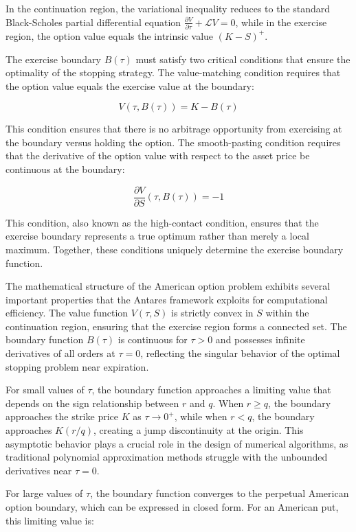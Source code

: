 \documentclass[
  american,
  11pt,
  11pt,
  letterpaper,
  onecolumn]{article}
\begin{document}
In the continuation region, the variational inequality reduces to the
standard Black-Scholes partial differential equation
\(\frac{\partial V}{\partial \tau} + \mathcal{L}V = 0\), while in the
exercise region, the option value equals the intrinsic value
\((K-S)^+\).

The exercise boundary \(B(\tau)\) must satisfy two critical conditions
that ensure the optimality of the stopping strategy. The value-matching
condition requires that the option value equals the exercise value at
the boundary:

\[V(\tau, B(\tau)) = K - B(\tau)\]

This condition ensures that there is no arbitrage opportunity from
exercising at the boundary versus holding the option. The smooth-pasting
condition requires that the derivative of the option value with respect
to the asset price be continuous at the boundary:

\[\frac{\partial V}{\partial S}(\tau, B(\tau)) = -1\]

This condition, also known as the high-contact condition, ensures that
the exercise boundary represents a true optimum rather than merely a
local maximum. Together, these conditions uniquely determine the
exercise boundary function.

The mathematical structure of the American option problem exhibits
several important properties that the Antares framework exploits for
computational efficiency. The value function \(V(\tau, S)\) is strictly
convex in \(S\) within the continuation region, ensuring that the
exercise region forms a connected set. The boundary function \(B(\tau)\)
is continuous for \(\tau > 0\) and possesses infinite derivatives of all
orders at \(\tau = 0\), reflecting the singular behavior of the optimal
stopping problem near expiration.

For small values of \(\tau\), the boundary function approaches a
limiting value that depends on the sign relationship between \(r\) and
\(q\). When \(r \geq q\), the boundary approaches the strike price \(K\)
as \(\tau \to 0^+\), while when \(r < q\), the boundary approaches
\(K(r/q)\), creating a jump discontinuity at the origin. This asymptotic
behavior plays a crucial role in the design of numerical algorithms, as
traditional polynomial approximation methods struggle with the unbounded
derivatives near \(\tau = 0\).

For large values of \(\tau\), the boundary function converges to the
perpetual American option boundary, which can be expressed in closed
form. For an American put, this limiting value is:
\end{document}
